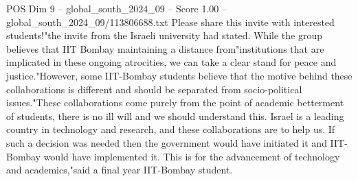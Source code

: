 \begin{textsample}{POS Dim 9 – global\_south\_2024\_09 – Score 1.00 – global\_south\_2024\_09/113806688.txt}
Please share this invite with interested students!"the invite from the Israeli university had stated.
While the group believes that IIT Bombay maintaining a distance from"institutions that are implicated in these ongoing atrocities, we can take a clear stand for peace and justice."However, some IIT-Bombay students believe that the motive behind these collaborations is different and should be separated from socio-political issues."These collaborations come purely from the point of academic betterment of students, there is no ill will and we should understand this.
Israel is a leading country in technology and research, and these collaborations are to help us.
If such a decision was needed then the government would have initiated it and IIT-Bombay would have implemented it.
This is for the advancement of technology and academics,"said a final year IIT-Bombay student.

\end{textsample}
